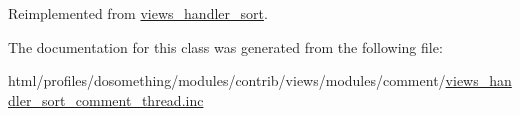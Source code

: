 Reimplemented from \hyperlink{classviews__handler__sort_a94fa33c5d037e41a927583fce2df3d18}{views\_\-handler\_\-sort}.

The documentation for this class was generated from the following file:\begin{DoxyCompactItemize}
\item 
html/profiles/dosomething/modules/contrib/views/modules/comment/\hyperlink{views__handler__sort__comment__thread_8inc}{views\_\-handler\_\-sort\_\-comment\_\-thread.inc}\end{DoxyCompactItemize}
